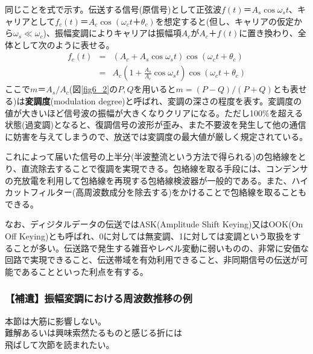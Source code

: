 同じことを式で示す。伝送する信号(原信号)として正弦波$f(t)＝A_s\cos\omega_st$、キャリアとして$f_c(t)＝A_c\cos(\omega_ct＋\theta_c)$を想定すると(但し、キャリアの仮定から$\omega_s\ll\omega_c$)、振幅変調によりキャリアは振幅項$A_c$が$A_c＋f(t)$に置き換わり、全体として次のように表せる。
\begin{eqnarray}
f_c(t)&=&(A_c+A_s\cos\omega_st)\cos(\omega_ct+\theta_c) \nonumber \\
&=&A_c\left(1+\frac{A_s}{A_c}\cos\omega_s t\right)\cos(\omega_ct+\theta_c) \label{eq_6_2}
\end{eqnarray}
ここで$m＝A_s/A_c$(図\ref{fig6_2}の$P,Q$を用いると$m=(P-Q)/(P+Q)$とも表せる)は\textbf{変調度}(modulation degree)と呼ばれ、変調の深さの程度を表す。変調度の値が大きいほど信号波の振幅が大きくなりクリアになる。ただし100\%を超える状態(過変調)となると、復調信号の波形が歪み、また不要波を発生して他の通信に妨害を与えてしまうので、放送では変調度の最大値が厳しく規定されている。

これによって届いた信号の上半分(半波整流という方法で得られる)の包絡線をとり、直流除去することで復調を実現できる。包絡線を取る手段には、コンデンサの充放電を利用して包絡線を再現する包絡線検波器が一般的である。また、ハイカットフィルター(高周波数成分を除去する)をかけることで包絡線を取ることもできる。

なお、ディジタルデータの伝送ではASK(Amplitude Shift Keying)又はOOK(On Off Keying)とも呼ばれ、0に対しては無変調、1に対しては変調という取扱をすることが多い。伝送路で発生する雑音やレベル変動に弱いものの、非常に安価な回路で実現できること、伝送帯域を有効利用できること、非同期信号の伝送が可能であることといった利点を有する。

\subsubsection{【補遺】振幅変調における周波数推移の例}
\begin{center}
\begin{minipage}[]{0.75\linewidth}
\begin{screen}
\begin{center}
本節は大筋に影響しない。\\
難解あるいは興味索然たるものと感じる折には\\
飛ばして次節を読まれたい。
\end{center}
\end{screen}
\end{minipage}
\end{center}

